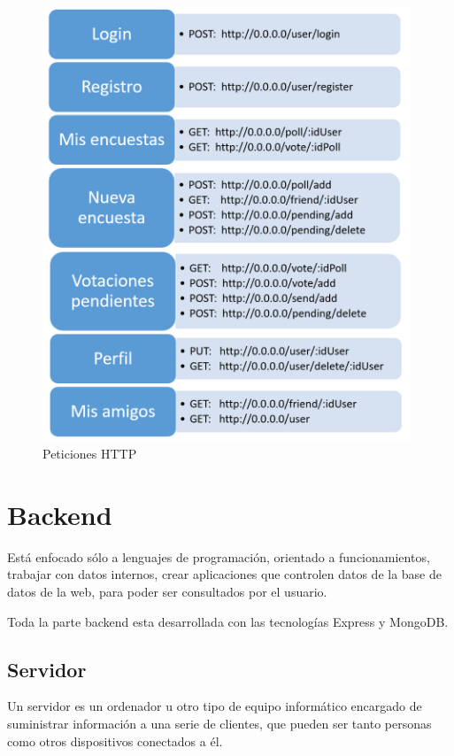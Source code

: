 \documentclass[a4paper, 12pt]{book}
\begin{document}
\begin{figure}[H]
  \centering
  \includegraphics[width=11cm, keepaspectratio]{img/http_service.png}
  \caption{Peticiones HTTP}
  \label{figura:http_service}
\end{figure}



\section{Backend}
\label{sec:backend}

Est\'a enfocado s\'olo a lenguajes de programaci\'on, orientado a funcionamientos, trabajar con datos internos, crear aplicaciones que controlen datos  de la base de datos de la web, para poder ser consultados por el usuario.

Toda la parte backend esta desarrollada con las tecnolog\'ias Express y MongoDB. 


\subsection{Servidor} 
\label{sec:servidor}

Un servidor es un ordenador u otro tipo de equipo inform\'atico encargado de suministrar informaci\'on a una serie de clientes, que pueden ser tanto personas como otros dispositivos conectados a \'el. 
\end{document}
